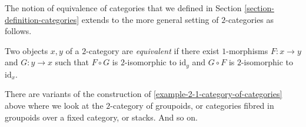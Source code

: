 \noindent
The notion of equivalence of categories that we defined in Section
\ref{section-definition-categories} extends to the more general setting of
$2$-categories as follows.

\begin{definition}
\label{definition-equivalence}
Two objects $x,y$ of a $2$-category are {\it equivalent} if there exist 
$1$-morphisms $F : x \to y$ and $G : y \to x$ such that $F \circ G$ is 
$2$-isomorphic to $\text{id}_y$ and $G \circ F$ is $2$-isomorphic to 
$\text{id}_x$.
\end{definition}

\begin{remark}
\label{remark-other-2-categories}
There are variants of the construction of
\ref{example-2-1-category-of-categories} above
where we look at the $2$-category of groupoids,
or categories fibred in groupoids over a fixed
category, or stacks. And so on.
\end{remark}

